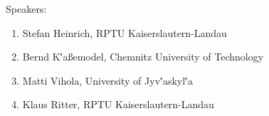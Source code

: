 \begin{talk}
Speakers:





\begin{enumerate}


\item Stefan Heinrich, RPTU Kaiserslautern-Landau


\item Bernd K\''a\ss emodel, Chemnitz University of Technology


\item Matti Vihola, University of Jyv\''askyl\''a 


\item Klaus Ritter, RPTU Kaiserslautern-Landau


 


\end{enumerate}








\end{talk}

